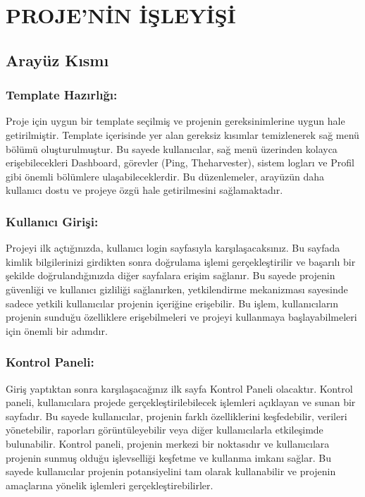 \section{PROJE'NİN İŞLEYİŞİ}
\subsection{Arayüz Kısmı }
\subsubsection{Template Hazırlığı:}
Proje için uygun bir template seçilmiş ve projenin gereksinimlerine uygun hale getirilmiştir. Template içerisinde yer alan gereksiz kısımlar temizlenerek sağ menü bölümü oluşturulmuştur. Bu sayede kullanıcılar, sağ menü üzerinden kolayca erişebilecekleri Dashboard, görevler (Ping, Theharvester), sistem logları ve Profil gibi önemli bölümlere ulaşabileceklerdir. Bu düzenlemeler, arayüzün daha kullanıcı dostu ve projeye özgü hale getirilmesini sağlamaktadır.
\subsubsection{Kullanıcı Girişi:}
Projeyi ilk açtığınızda, kullanıcı login sayfasıyla karşılaşacaksınız. Bu sayfada kimlik bilgilerinizi girdikten sonra doğrulama işlemi gerçekleştirilir ve başarılı bir şekilde doğrulandığınızda diğer sayfalara erişim sağlanır. Bu sayede projenin güvenliği ve kullanıcı gizliliği sağlanırken, yetkilendirme mekanizması sayesinde sadece yetkili kullanıcılar projenin içeriğine erişebilir. Bu işlem, kullanıcıların projenin sunduğu özelliklere erişebilmeleri ve projeyi kullanmaya başlayabilmeleri için önemli bir adımdır.
\subsubsection{Kontrol Paneli:}
Giriş yaptıktan sonra karşılaşacağınız ilk sayfa Kontrol Paneli olacaktır. Kontrol paneli, kullanıcılara projede gerçekleştirilebilecek işlemleri açıklayan ve sunan bir sayfadır. Bu sayede kullanıcılar, projenin farklı özelliklerini keşfedebilir, verileri yönetebilir, raporları görüntüleyebilir veya diğer kullanıcılarla etkileşimde bulunabilir. Kontrol paneli, projenin merkezi bir noktasıdır ve kullanıcılara projenin sunmuş olduğu işlevselliği keşfetme ve kullanma imkanı sağlar. Bu sayede kullanıcılar projenin potansiyelini tam olarak kullanabilir ve projenin amaçlarına yönelik işlemleri gerçekleştirebilirler.
